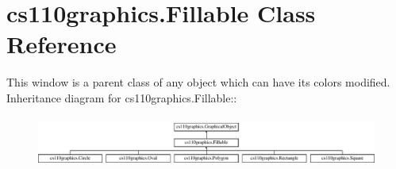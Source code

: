 \hypertarget{classcs110graphics_1_1Fillable}{
\section{cs110graphics.Fillable Class Reference}
\label{classcs110graphics_1_1Fillable}
}


This window is a parent class of any object which can have its colors modified.  
Inheritance diagram for cs110graphics.Fillable::\begin{figure}[H]
\begin{center}
\leavevmode
\includegraphics[height=1.68844cm]{classcs110graphics_1_1Fillable}
\end{center}
\end{figure}
